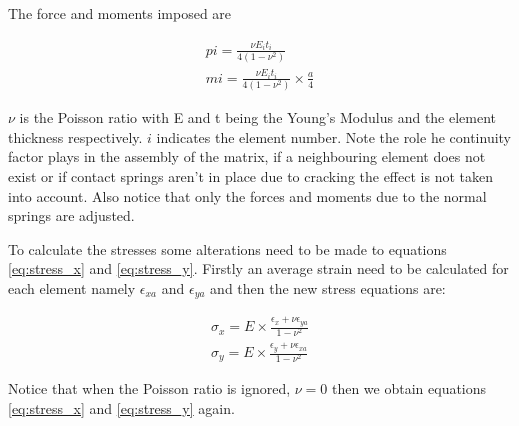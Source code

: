 The force and moments imposed are

\begin{eqnarray}
pi = \frac{\nu E_i t_i}{4(1-\nu^2)} \\
mi = \frac{\nu E_i t_i}{4(1-\nu^2)} \times \frac{a}{4}
\end{eqnarray}

$\nu$ is the Poisson ratio with E and t being the Young's Modulus and the element thickness respectively.  $i$ indicates the element number.  Note the role he continuity factor plays in the assembly of the matrix, if a neighbouring element does not exist or if contact springs aren't in place due to cracking the effect is not taken into account.  Also notice that only the forces and moments due to the normal springs are adjusted. 

To calculate the stresses some alterations need to be made to equations \ref{eq:stress_x} and \ref{eq:stress_y}.  Firstly an average strain need to be calculated for each element namely $\epsilon_{xa}$ and $\epsilon_{ya}$ and then the new stress equations are:

\begin{eqnarray}
\sigma_x = E \times \frac{\epsilon_x + \nu \epsilon_{ya}}{1-\nu^2} \\
\sigma_y = E \times \frac{\epsilon_y + \nu \epsilon_{xa}}{1-\nu^2}
\end{eqnarray}

Notice that when the Poisson ratio is ignored, $\nu=0$ then we obtain equations \ref{eq:stress_x} and \ref{eq:stress_y} again. 






 
